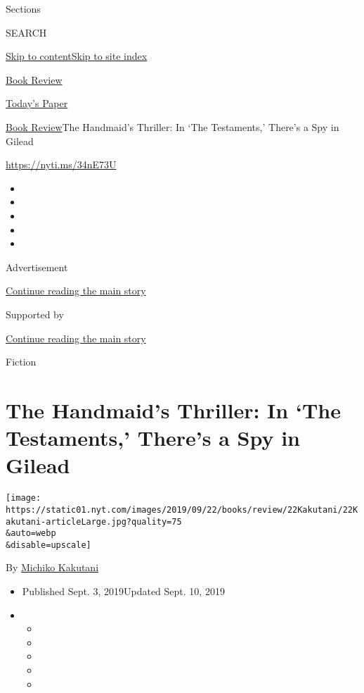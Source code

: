 Sections

SEARCH

\protect\hyperlink{site-content}{Skip to
content}\protect\hyperlink{site-index}{Skip to site index}

\href{https://www.nytimes.com/section/books/review}{Book Review}

\href{https://myaccount.nytimes.com/auth/login?response_type=cookie\&client_id=vi}{}

\href{https://www.nytimes.com/section/todayspaper}{Today's Paper}

\href{/section/books/review}{Book Review}\textbar{}The Handmaid's
Thriller: In `The Testaments,' There's a Spy in Gilead

\url{https://nyti.ms/34nE73U}

\begin{itemize}
\item
\item
\item
\item
\item
\end{itemize}

Advertisement

\protect\hyperlink{after-top}{Continue reading the main story}

Supported by

\protect\hyperlink{after-sponsor}{Continue reading the main story}

Fiction

\hypertarget{the-handmaids-thriller-in-the-testaments-theres-a-spy-in-gilead}{%
\section{The Handmaid's Thriller: In `The Testaments,' There's a Spy in
Gilead}\label{the-handmaids-thriller-in-the-testaments-theres-a-spy-in-gilead}}

\texttt{[image: https://static01.nyt.com/images/2019/09/22/books/review/22Kakutani/22Kakutani-articleLarge.jpg?quality=75\\\&auto=webp\\\&disable=upscale]}

By \href{https://www.nytimes.com/by/michiko-kakutani}{Michiko Kakutani}

\begin{itemize}
\item
  Published Sept. 3, 2019Updated Sept. 10, 2019
\item
  \begin{itemize}
  \item
  \item
  \item
  \item
  \item
  \end{itemize}
\end{itemize}

